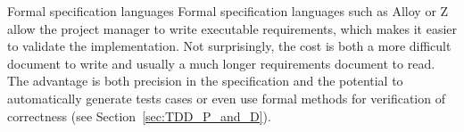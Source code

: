 \begin{elaboration}{Formal specification languages}
Formal specification languages such as Alloy or Z allow the project manager to write executable requirements, which makes it easier to validate the implementation. Not surprisingly, the cost is both a more difficult document to write and usually a much longer requirements document to read. The advantage is both precision in the specification and the potential to automatically generate tests cases or even use formal methods for verification of correctness (see Section~\ref{sec:TDD_P_and_D}).
\end{elaboration}
